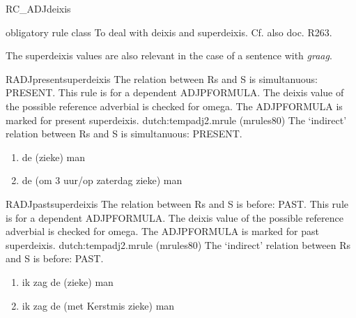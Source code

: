 \begin{mruleclass}{RC\_ADJdeixis}
\begin{classdescr}
\kind obligatory rule class
\classtask To deal with deixis and superdeixis. Cf. also doc. R263.
\classremarks

The superdeixis values are also relevant 
in the case 
of a sentence with {\em graag}.


\nofilters

\nospeedrules

\noplannedrules

\norulesnotince

\end{classdescr}

\begin{members}
\begin{member}
 RADJpresentsuperdeixis
 The relation between Rs and S is simultanuous: PRESENT.
               This rule is for a dependent ADJPFORMULA.
               The deixis value of the possible reference adverbial is checked 
               for omega.
               The ADJPFORMULA is marked for present superdeixis.
\file dutch:tempadj2.mrule (mrules80)
\semantics The `indirect' relation between Rs and S is simultanuous: PRESENT.

\example\mbox{}
\begin{enumerate}
  \item 
de (zieke) man
  \item
                            de (om 3 uur/op zaterdag zieke) man
\end{enumerate}
\remarks\mbox{}

\end{member}
\begin{member}
 RADJpastsuperdeixis
 The relation between Rs and S is before: PAST.
               This rule is for a dependent ADJPFORMULA.
               The deixis 
value of the possible reference adverbial is checked for 
               omega.
               The ADJPFORMULA is marked for past superdeixis.
\file dutch:tempadj2.mrule (mrules80)
\semantics The `indirect' relation between Rs and S is before: PAST.

\example\mbox{}
\begin{enumerate}
  \item 
 ik zag de (zieke) man
  \item
ik zag de (met Kerstmis zieke) man
\end{enumerate}
\remarks\mbox{}

\end{member}

\end{members}
\end{mruleclass}

